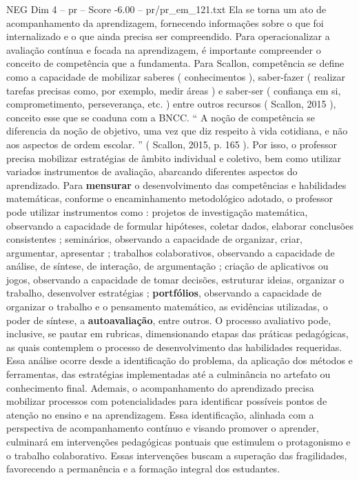 \begin{textsample}{NEG Dim 4 – pr – Score -6.00 – pr/pr\_em\_121.txt}
Ela se torna um ato de acompanhamento da aprendizagem, fornecendo informações sobre o que foi internalizado e o que ainda precisa ser compreendido.
Para operacionalizar a avaliação contínua e focada na aprendizagem, é importante compreender o conceito de competência que a fundamenta.
Para Scallon, competência se define como a capacidade de mobilizar saberes ( conhecimentos ), saber-fazer ( realizar tarefas precisas como, por exemplo, medir áreas ) e saber-ser ( confiança em si, comprometimento, perseverança, etc. ) entre outros recursos ( Scallon, 2015 ), conceito esse que se coaduna com a BNCC. “ A noção de competência se diferencia da noção de objetivo, uma vez que diz respeito à vida cotidiana, e não aos aspectos de ordem escolar. ” ( Scallon, 2015, p. 165 ).
Por isso, o professor precisa mobilizar estratégias de âmbito individual e coletivo, bem como utilizar variados instrumentos de avaliação, abarcando diferentes aspectos do aprendizado.
Para \textbf{mensurar} o desenvolvimento das competências e habilidades matemáticas, conforme o encaminhamento metodológico adotado, o professor pode utilizar instrumentos como : projetos de investigação matemática, observando a capacidade de formular hipóteses, coletar dados, elaborar conclusões consistentes ; seminários, observando a capacidade de organizar, criar, argumentar, apresentar ; trabalhos colaborativos, observando a capacidade de análise, de síntese, de interação, de argumentação ; criação de aplicativos ou jogos, observando a capacidade de tomar decisões, estruturar ideias, organizar o trabalho, desenvolver estratégias ; \textbf{portfólios}, observando a capacidade de organizar o trabalho e o pensamento matemático, as evidências utilizadas, o poder de síntese, a \textbf{autoavaliação}, entre outros.
O processo avaliativo pode, inclusive, se pautar em rubricas, dimensionando etapas das práticas pedagógicas, as quais contemplem o processo de desenvolvimento das habilidades requeridas.
Essa análise ocorre desde a identificação do problema, da aplicação dos métodos e ferramentas, das estratégias implementadas até a culminância no artefato ou conhecimento final.
Ademais, o acompanhamento do aprendizado precisa mobilizar processos com potencialidades para identificar possíveis pontos de atenção no ensino e na aprendizagem.
Essa identificação, alinhada com a perspectiva de acompanhamento contínuo e visando promover o aprender, culminará em intervenções pedagógicas pontuais que estimulem o protagonismo e o trabalho colaborativo.
Essas intervenções buscam a superação das fragilidades, favorecendo a permanência e a formação integral dos estudantes.

\end{textsample}
